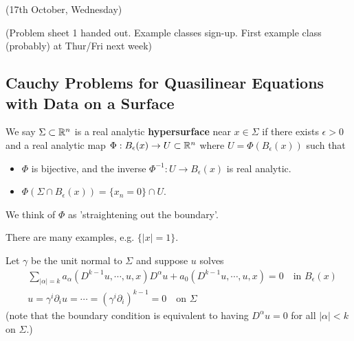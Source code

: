 \documentclass[10pt,a4paper]{report}
\begin{document}
\newday

(17th October, Wednesday)
\s

(Problem sheet 1 handed out. Example classes sign-up. First example class (probably) at Thur/Fri next week)
\s

\subsection*{Cauchy Problems for Quasilinear Equations with Data on a Surface}

We say $\Sigma \subset \mathbb{R}^n$ is a real analytic \textbf{hypersurface} near $x\in \Sigma$ if there exists $\epsilon >0$ and a real analytic map $\Phi : B_{\epsilon } (x) \rightarrow U \subset \mathbb{R}^n$ where $U = \Phi(B_{\epsilon}(x))$ such that
\begin{itemize}
\item $\Phi$ is bijective, and the inverse $\Phi^{-1} : U\rightarrow B_{\epsilon}(x)$ is real analytic.
\item $\Phi (\Sigma \cap B_{\epsilon}(x)) = \{x_n=0 \} \cap U$.
\end{itemize}
We think of $\Phi$ as 'straightening out the boundary'. 
\s

There are many examples, e.g. $\{|x|=1\}$.
\s

Let $\gamma$ be the unit normal to $\Sigma$ and suppose $u$ solves
\begin{align}
& \sum_{|\alpha| =k} a_{\alpha}(D^{k-1}u, \cdots, u,x)D^{\alpha} u + a_0(D^{k-1}u, \cdots, u,x) =0 \quad \text{in } B_{\epsilon}(x) \label{dagger}\\
& u= \gamma^i \partial_i u = \cdots =(\gamma^i \partial_i)^{k-1} = 0 \quad \text{on } \Sigma \nonumber
\end{align}
(note that the boundary condition is equivalent to having $D^{\alpha} u =0$ for all $|\alpha| <k$ on $\Sigma$.)
\s
\end{document}
